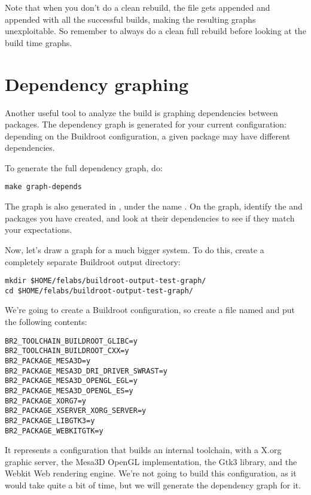 Note that when you don't do a clean rebuild, the 
file gets appended and appended with all the successful builds, making
the resulting graphs unexploitable. So remember to always do a clean
full rebuild before looking at the build time graphs.

\section{Dependency graphing}

Another useful tool to analyze the build is graphing dependencies
between packages. The dependency graph is generated for your current
configuration: depending on the Buildroot configuration, a given
package may have different dependencies.

To generate the full dependency graph, do:

\begin{verbatim}
make graph-depends
\end{verbatim}

The graph is also generated in , under the name
. On the graph, identify the  and
 packages you have created, and look at their
dependencies to see if they match your expectations.

Now, let's draw a graph for a much bigger system. To do this, create a
completely separate Buildroot output directory:

\begin{verbatim}
mkdir $HOME/felabs/buildroot-output-test-graph/
cd $HOME/felabs/buildroot-output-test-graph/
\end{verbatim}

We're going to create a Buildroot configuration, so create a file
named  and put the following contents:

\begin{verbatim}
BR2_TOOLCHAIN_BUILDROOT_GLIBC=y
BR2_TOOLCHAIN_BUILDROOT_CXX=y
BR2_PACKAGE_MESA3D=y
BR2_PACKAGE_MESA3D_DRI_DRIVER_SWRAST=y
BR2_PACKAGE_MESA3D_OPENGL_EGL=y
BR2_PACKAGE_MESA3D_OPENGL_ES=y
BR2_PACKAGE_XORG7=y
BR2_PACKAGE_XSERVER_XORG_SERVER=y
BR2_PACKAGE_LIBGTK3=y
BR2_PACKAGE_WEBKITGTK=y
\end{verbatim}

It represents a configuration that builds an internal toolchain, with
a X.org graphic server, the Mesa3D OpenGL implementation, the Gtk3
library, and the Webkit Web rendering engine. We're not going to build
this configuration, as it would take quite a bit of time, but we will
generate the dependency graph for it.

